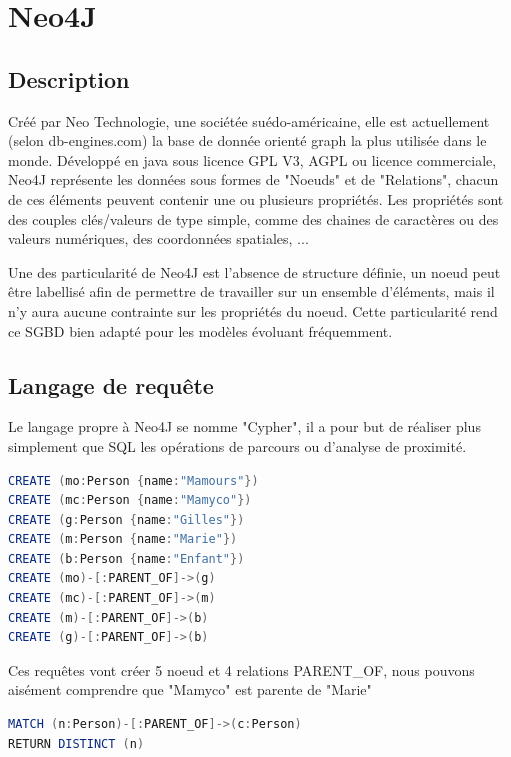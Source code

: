 \documentclass[a4paper,fleqn,12pt]{report}
\begin{document}
\chapter{Neo4J}

\section{Description}

Créé par Neo Technologie, une sociétée suédo-américaine, elle est actuellement (selon db-engines.com) la base de donnée orienté graph la plus utilisée dans le monde. Développé en java sous licence GPL V3, AGPL ou licence commerciale, Neo4J représente les données sous formes de "Noeuds" et de "Relations", chacun de ces éléments peuvent contenir une ou plusieurs propriétés. Les propriétés sont des couples clés/valeurs de type simple, comme des chaines de caractères ou des valeurs numériques, des coordonnées spatiales, ... 

Une des particularité de Neo4J est l'absence de structure définie, un noeud peut être labellisé afin de permettre de travailler sur un ensemble d'éléments, mais il n'y aura aucune contrainte sur les propriétés du noeud. Cette particularité rend ce SGBD bien adapté pour les modèles évoluant fréquemment.

\section{Langage de requête}

Le langage propre à Neo4J se nomme "Cypher", il a pour but de réaliser plus simplement que SQL les opérations de parcours ou d'analyse de proximité.

\begin{lstlisting}[language=java, frame=single]
CREATE (mo:Person {name:"Mamours"})
CREATE (mc:Person {name:"Mamyco"})
CREATE (g:Person {name:"Gilles"})
CREATE (m:Person {name:"Marie"})
CREATE (b:Person {name:"Enfant"})
CREATE (mo)-[:PARENT_OF]->(g)
CREATE (mc)-[:PARENT_OF]->(m)
CREATE (m)-[:PARENT_OF]->(b)
CREATE (g)-[:PARENT_OF]->(b)
\end{lstlisting}

Ces requêtes vont créer 5 noeud et 4 relations PARENT\_OF, nous pouvons aisément comprendre que "Mamyco" est parente de "Marie"

\begin{lstlisting}[language=java, frame=single]
MATCH (n:Person)-[:PARENT_OF]->(c:Person) 
RETURN DISTINCT (n)
	
\end{lstlisting}
\end{document}
